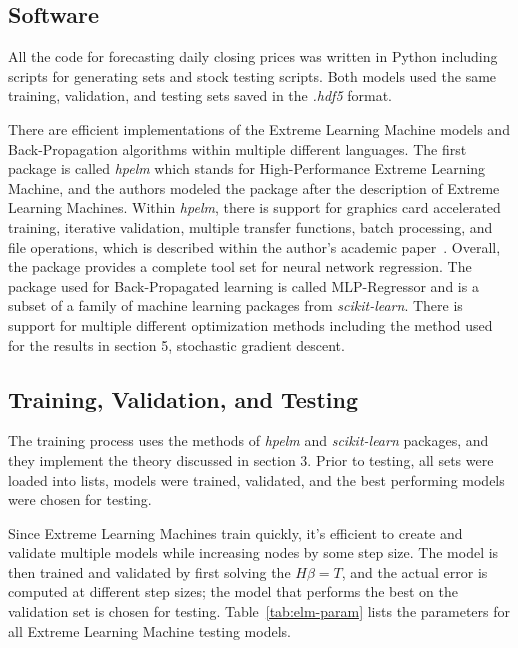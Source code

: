 \subsection{Software}\label{subsec:software}
All the code for forecasting daily closing prices was written in Python including scripts for generating sets and stock testing scripts.
Both models used the same training, validation, and testing sets saved in the \textit{.hdf5} format.

There are efficient implementations of the Extreme Learning Machine models and Back-Propagation algorithms within multiple different languages.
The first package is called \textit{hpelm} which stands for High-Performance Extreme Learning Machine, and the authors modeled the package after the description of Extreme Learning Machines.
Within \textit{hpelm}, there is support for graphics card accelerated training, iterative validation, multiple transfer functions, batch processing, and file operations, which is described within the author's academic paper~\citep{Akusok:2015}.
Overall, the package provides a complete tool set for neural network regression.
The package used for Back-Propagated learning is called MLP-Regressor and is a subset of a family of machine learning packages from \textit{scikit-learn}.
There is support for multiple different optimization methods including the method used for the results in section 5, stochastic gradient descent.

\subsection{Training, Validation, and Testing}\label{subsec:training-validation-and-testing}
The training process uses the methods of \textit{hpelm} and \textit{scikit-learn} packages, and they implement the theory discussed in section 3.
Prior to testing, all sets were loaded into lists, models were trained, validated, and the best performing models were chosen for testing.

Since Extreme Learning Machines train quickly, it's efficient to create and validate multiple models while increasing nodes by some step size.
The model is then trained and validated by first solving the $H\beta=T$, and the actual error is computed at different step sizes; the model that performs the best on the validation set is chosen for testing.
Table~\ref{tab:elm-param} lists the parameters for all Extreme Learning Machine testing models.


